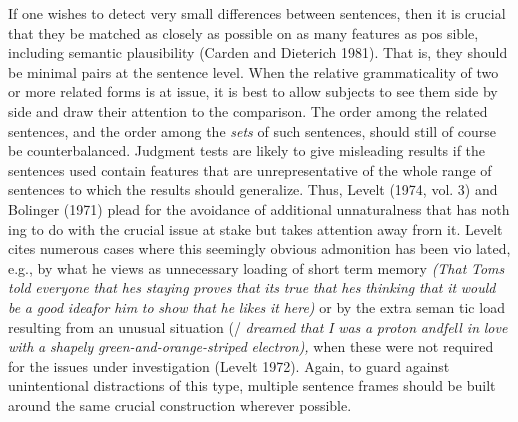 \begin{styleTextbody}
If one wishes to detect very small differences between sentences, then it is crucial that they be matched as closely as possible on as many features as pos\- sible, including semantic plausibility (Carden and Dieterich 1981). That is, they should be minimal pairs at the sentence level. When the relative grammaticality of two or more related forms is at issue, it is best to allow subjects to see them side by side and draw their attention to the comparison. The order among the related sentences, and the order among the \textit{sets}\textit{ }of such sentences, should still of course be counterbalanced. Judgment tests are likely to give misleading results if the sentences used contain features that are unrepresentative of the whole range of sentences to which the results should generalize. Thus, Levelt (1974, vol. 3) and Bolinger (1971) plead for the avoidance of additional unnaturalness that has noth\- ing to do with the crucial issue at stake but takes attention away frorn it. Levelt cites numerous cases where this seemingly obvious admonition has been vio\- lated, e.g., by what he views as unnecessary loading of short term memory \textit{(That}\textit{ }\textit{Tom{\textquotesingle}s}\textit{ }\textit{told}\textit{ }\textit{everyone}\textit{ }\textit{that}\textit{ }\textit{he{\textquotesingle}s}\textit{ }\textit{staying}\textit{ }\textit{proves}\textit{ }\textit{that}\textit{ }\textit{it{\textquotesingle}s}\textit{ }\textit{true}\textit{ }\textit{that}\textit{ }\textit{he{\textquotesingle}s}\textit{ }\textit{thinking}\textit{ }\textit{that}\textit{ }\textit{it}\textit{ }\textit{would}\textit{ }\textit{be}\textit{ }\textit{a}\textit{ }\textit{good}\textit{ }\textit{ideafor}\textit{ }\textit{him}\textit{ }\textit{to}\textit{ }\textit{show}\textit{ }\textit{that}\textit{ }\textit{he}\textit{ }\textit{likes}\textit{ }\textit{it}\textit{ }\textit{here)}\textit{ }or by the extra seman\- tic load resulting from an unusual situation (/ \textit{dreamed}\textit{ }\textit{that}\textit{ }\textit{I}\textit{ }\textit{was}\textit{ }\textit{a}\textit{ }\textit{proton}\textit{ }\textit{an}\textit{d}\textit{fell in}\textit{ }\textit{love}\textit{ }\textit{with}\textit{ }\textit{a}\textit{ }\textit{shapely}\textit{ }\textit{green-and-orange-striped}\textit{ }\textit{electron),}\textit{ }when these were not required for the issues under investigation (Levelt 1972). Again, to guard against unintentional distractions of this type, multiple sentence frames should be built around the same crucial construction wherever possible.
\end{styleTextbody}


